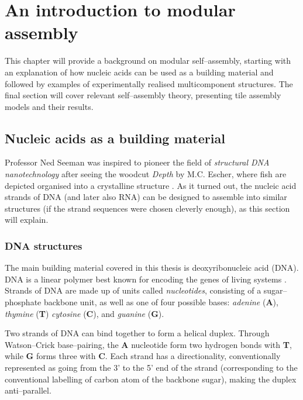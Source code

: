
\chapter{An introduction to modular assembly}
\label{ch:polycubes_intro}

\minitoc

This chapter will provide a background on modular self--assembly, starting with an explanation of how nucleic acids can be used as a building material and followed by examples of experimentally realised multicomponent structures. The final section will cover relevant self--assembly theory, presenting tile assembly models and their results.


\section{Nucleic acids as a building material}
Professor Ned Seeman was inspired to pioneer the field of \emph{structural DNA nanotechnology} after seeing the woodcut \emph{Depth} by M.C. Escher, where fish are depicted organised into a crystalline structure \cite{seeman_2016}. As it turned out, the nucleic acid strands of DNA (and later also RNA) can be designed to assemble into similar structures (if the strand sequences were chosen cleverly enough), as this section will explain.

\subsection{DNA structures}

The main building material covered in this thesis is deoxyribonucleic acid (DNA). DNA is a linear polymer best known for encoding the genes of living systems \cite{calladine1997understanding}. Strands of DNA are made up of units called \emph{nucleotides}, consisting of a sugar--phosphate backbone unit, as well as one of four possible bases: \emph{adenine} (\textbf{A}), \emph{thymine} (\textbf{T}) \emph{cytosine} (\textbf{C}), and \emph{guanine} (\textbf{G}). 

Two strands of DNA can bind together to form a helical duplex. Through Watson--Crick base--pairing, the \textbf{A} nucleotide form two hydrogen bonds with \textbf{T}, while \textbf{G} forms three with \textbf{C}. Each strand has a directionality, conventionally represented as going from the 3' to the 5' end of the strand (corresponding to the conventional labelling of carbon atom of the backbone sugar), making the duplex anti--parallel.

